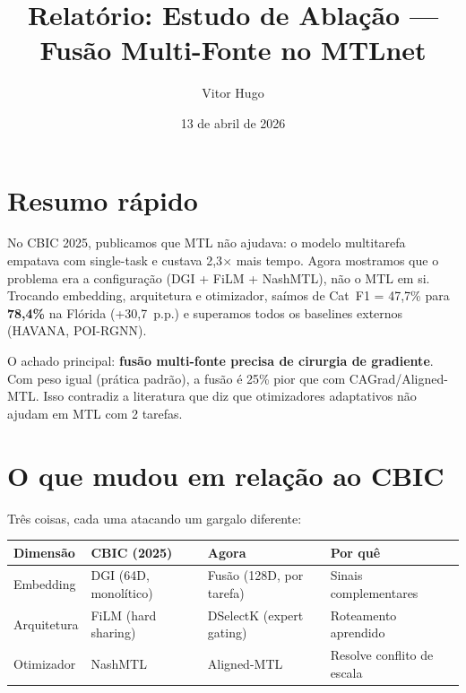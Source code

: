 \documentclass[12pt,a4paper]{article}
\title{\textbf{Relatório: Estudo de Ablação --- Fusão Multi-Fonte no MTLnet}}
\author{Vitor Hugo}
\date{13 de abril de 2026}
\begin{document}
\maketitle

\section{Resumo rápido}

No CBIC 2025, publicamos que MTL não ajudava: o modelo multitarefa empatava com single-task e custava 2,3$\times$ mais tempo. Agora mostramos que o problema era a configuração (DGI + FiLM + NashMTL), não o MTL em si. Trocando embedding, arquitetura e otimizador, saímos de Cat~F1 = 47,7\% para \textbf{78,4\%} na Flórida (+30,7~p.p.) e superamos todos os baselines externos (HAVANA, POI-RGNN).

O achado principal: \textbf{fusão multi-fonte precisa de cirurgia de gradiente}. Com peso igual (prática padrão), a fusão é 25\% pior que com CAGrad/Aligned-MTL. Isso contradiz a literatura que diz que otimizadores adaptativos não ajudam em MTL com 2 tarefas.

\section{O que mudou em relação ao CBIC}

Três coisas, cada uma atacando um gargalo diferente:

\begin{table}[H]
\centering
\small
\begin{tabular}{llll}
\toprule
\textbf{Dimensão} & \textbf{CBIC (2025)} & \textbf{Agora} & \textbf{Por quê} \\
\midrule
Embedding & DGI (64D, monolítico) & Fusão (128D, por tarefa) & Sinais complementares \\
Arquitetura & FiLM (hard sharing) & DSelectK (expert gating) & Roteamento aprendido \\
Otimizador & NashMTL & Aligned-MTL & Resolve conflito de escala \\
\bottomrule
\end{tabular}
\end{table}
\end{document}
